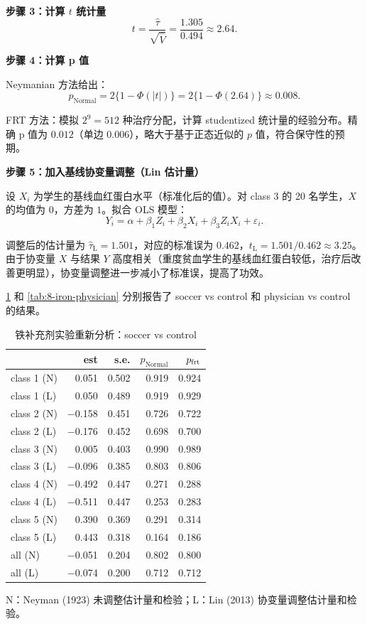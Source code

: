 \textbf{步骤 3：计算 $t$ 统计量}
\[
t = \frac{\hat\tau}{\sqrt{\hat V}} = \frac{1.305}{0.494} \approx 2.64.
\]

\textbf{步骤 4：计算 p 值}

Neymanian 方法给出：
\[
p_\text{Normal} = 2\{1 - \Phi(|t|)\} = 2\{1 - \Phi(2.64)\} \approx 0.008.
\]

FRT 方法：模拟 $2^9 = 512$ 种治疗分配，计算 studentized 统计量的经验分布。精确 p 值为 $0.012$（单边 $0.006$），略大于基于正态近似的 $p$ 值，符合保守性的预期。

\textbf{步骤 5：加入基线协变量调整（Lin 估计量）}

设 $X_i$ 为学生的基线血红蛋白水平（标准化后的值）。对 class 3 的 20 名学生，$X$ 的均值为 $0$，方差为 $1$。拟合 OLS 模型：
\[
Y_i = \alpha + \beta_1 Z_i + \beta_2 X_i + \beta_3 Z_i X_i + \varepsilon_i.
\]

调整后的估计量为 $\hat\tau_\mathrm{L} = 1.501$，对应的标准误为 $0.462$，$t_\mathrm{L} = 1.501 / 0.462 \approx 3.25$。由于协变量 $X$ 与结果 $Y$ 高度相关（重度贫血学生的基线血红蛋白较低，治疗后改善更明显），协变量调整进一步减小了标准误，提高了功效。

\cref{tab:8-iron-soccer} 和 \cref{tab:8-iron-physician} 分别报告了 soccer vs control 和 physician vs control 的结果。

\begin{table}[htbp]
\caption{铁补充剂实验重新分析：soccer vs control}
\label{tab:8-iron-soccer}
\centering
\begin{tabular}{lrrrr}
\toprule
 & est & s.e. & $p_\text{Normal}$ & $p_{\text{frt}}$ \\
\midrule
class 1 (N) & 0.051 & 0.502 & 0.919 & 0.924 \\
class 1 (L) & 0.050 & 0.489 & 0.919 & 0.929 \\
class 2 (N) & $-$0.158 & 0.451 & 0.726 & 0.722 \\
class 2 (L) & $-$0.176 & 0.452 & 0.698 & 0.700 \\
class 3 (N) & 0.005 & 0.403 & 0.990 & 0.989 \\
class 3 (L) & $-$0.096 & 0.385 & 0.803 & 0.806 \\
class 4 (N) & $-$0.492 & 0.447 & 0.271 & 0.288 \\
class 4 (L) & $-$0.511 & 0.447 & 0.253 & 0.283 \\
class 5 (N) & 0.390 & 0.369 & 0.291 & 0.314 \\
class 5 (L) & 0.443 & 0.318 & 0.164 & 0.186 \\
\midrule
all (N) & $-$0.051 & 0.204 & 0.802 & 0.800 \\
all (L) & $-$0.074 & 0.200 & 0.712 & 0.712 \\
\bottomrule
\end{tabular}
\par\medskip\small
N：Neyman (1923) 未调整估计量和检验；L：Lin (2013) 协变量调整估计量和检验。
\end{table}

